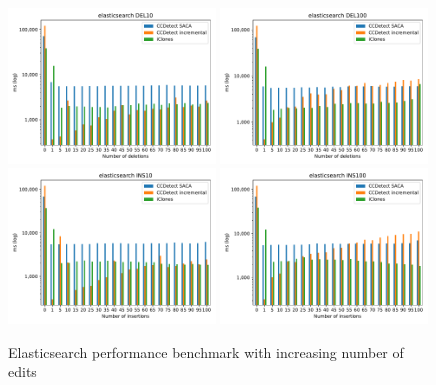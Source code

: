 \vfill

\newpage
\null
\vfill

\begin{figure}[H]
    \begin{center}
        \includegraphics[width=0.49\textwidth]{figures/incedit_performancegraphs/elasticsearch_DEL10.pdf}
        \includegraphics[width=0.49\textwidth]{figures/incedit_performancegraphs/elasticsearch_DEL100.pdf}
        \includegraphics[width=0.49\textwidth]{figures/incedit_performancegraphs/elasticsearch_INS10.pdf}
        \includegraphics[width=0.49\textwidth]{figures/incedit_performancegraphs/elasticsearch_INS100.pdf}
    \end{center}
    \caption{Elasticsearch performance benchmark with increasing number of edits}
    \label{fig:elasticsearch_inc}
\end{figure}

